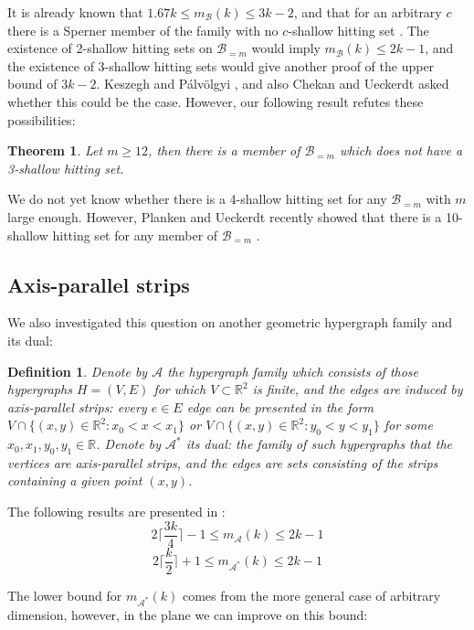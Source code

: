 \documentclass[11pt,oneside]{amsart}
\newcommand{\R}{\mathbb{R}}
\newcommand{\A}{\mathcal{A}}
\newcommand{\B}{\mathcal{B}}
\newtheorem{theorem}{Theorem}
\newtheorem{definition}{Definition}
\begin{document}
It is already known \cite{feneketlen} that $1.67k\le m_{\mathcal{B}}(k)\le 3k-2$, and that for an arbitrary $c$ there is a Sperner member of the family with no $c$-shallow hitting set \cite{pshalfplane}. The existence of 2-shallow hitting sets on $\B_{=m}$ would imply $m_{\mathcal{B}}(k)\le 2k-1$, and the existence of 3-shallow hitting sets would give another proof of the upper bound of $3k-2$. Keszegh and Pálvölgyi \cite{pshalfplane}, and also Chekan and Ueckerdt \cite{chekan2022polychromatic} asked whether this could be the case. However, our following result refutes these possibilities:

\begin{theorem}\label{bottomless}
Let $m \ge 12$, then there is a member of $\mathcal{B}_{=m}$ which does not have a 3-shallow hitting set.
\end{theorem}

We do not yet know whether there is a 4-shallow hitting set for any $\mathcal{B}_{=m}$ with $m$ large enough. However, Planken and Ueckerdt recently showed that there is a 10-shallow hitting set for any member of $\mathcal{B}_{=m}$ \cite{bless10}.

\subsection{Axis-parallel strips}

We also investigated this question on another geometric hypergraph family and its dual:


\begin{definition} Denote by $\A$ the hypergraph family which consists of those hypergraphs $H=(V,E)$ for which $V\subset \R^2$ is finite, and the edges are induced by axis-parallel strips: every $e\in E$ edge can be presented in the form $V\cap\{(x,y)\in\R^2: x_0<x<x_1\}$ or $V\cap\{(x,y)\in\R^2: y_0<y<y_1\}$ for some $x_0, x_1, y_0, y_1 \in\R$. Denote by $\A^*$ its dual: the family of such hypergraphs that the vertices are axis-parallel strips, and the edges are sets consisting of the strips containing a given point $(x,y)$. 
\end{definition}


The following results are presented in \cite{apstrip}: 
$$2\bigg\lceil\frac{3k}{4}\bigg\rceil-1 \le m_\A(k)\le 2k-1$$
$$2\bigg\lceil \frac{k}{2}\bigg\rceil +1\le m_{\A^*}(k)\le 2k-1$$

The lower bound for $m_{\A^*}(k)$ comes from the more general case of arbitrary dimension, however, in the plane we can improve on this bound:
\end{document}

